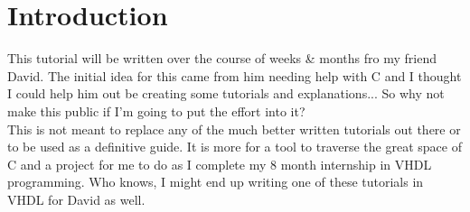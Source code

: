 \section{Introduction}
This tutorial will be written over the course of weeks \& months fro my friend David. The initial idea for this came from him needing help with C and I thought I could help him out be creating some tutorials and explanations... So why not make this public if I'm going to put the effort into it?\\
This is not meant to replace any of the much better written tutorials out there or to be used as a definitive guide. It is more for a tool to traverse the great space of C and a project for me to do as I complete my 8 month internship in VHDL programming. Who knows, I might end up writing one of these tutorials in VHDL for David as well.\\
